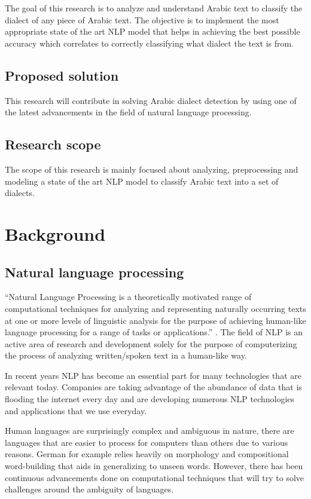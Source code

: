 \documentclass[12pt]{diazessay}
\begin{document}
    The goal of this research is to analyze and understand Arabic text to classify the dialect of any piece of Arabic text.
    The objective is to implement the most appropriate state of the art NLP model that helps in achieving the best possible accuracy which correlates to correctly classifying what dialect the text is from.

    \subsection{Proposed solution}
    This research will contribute in solving Arabic dialect detection by using one of the latest advancements in the field of natural language processing.
    
    
    \subsection{Research scope}
    The scope of this research is mainly focused about analyzing, preprocessing and modeling a state of the art NLP model to classify Arabic text into a set of dialects. 


\section{Background}


    \subsection{Natural language processing}
        “Natural Language Processing is a theoretically motivated range of computational techniques for
        analyzing and representing naturally occurring texts at one or more levels of linguistic analysis for the purpose of achieving human-like language processing for a range of tasks or applications.” \cite{natural_language_processing_book}. The field of NLP is an active area of research and development solely for the purpose of computerizing the process of analyzing written/spoken text in a human-like way.
        
        In recent years NLP has become an essential part for many technologies that are relevant today. Companies are taking advantage of the abundance of data that is flooding the internet every day and are developing numerous NLP technologies and applications that we use everyday.
        
        Human languages are surprisingly complex and ambiguous in nature, there are languages that are easier to process for computers than others due to various reasons. German for example relies heavily on morphology and compositional word-building that aids in generalizing to unseen words\cite{Felipe_Geraldo}. However, there has been continuous advancements done on computational techniques that will try to solve challenges around the ambiguity of languages.
    
\end{document}
